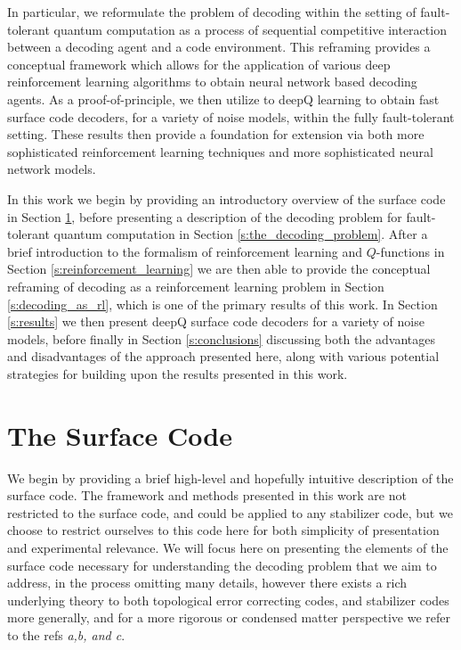 \documentclass[onecolumn,preprintnumbers,amsmath,amssymb,notitlepage,nofootinbib,longbibliography,superscriptaddress,aps,pra,10pt]{revtex4-1}
\begin{document}
	In particular, we reformulate the problem of decoding within the setting of fault-tolerant quantum computation as a process of sequential competitive interaction between a decoding agent and a code environment.
	This reframing provides a conceptual framework which allows for the application of various deep reinforcement learning algorithms to obtain neural network based decoding agents.
	As a proof-of-principle, we then utilize to deepQ learning to obtain fast surface code decoders, for a variety of noise models, within the fully fault-tolerant setting.
	These results then provide a foundation for extension via both more sophisticated reinforcement learning techniques and more sophisticated neural network models.

	In this work we begin by providing an introductory overview of the surface code in Section \ref{s:the_surface_code}, before presenting a description of the decoding problem for fault-tolerant quantum computation in Section \ref{s:the_decoding_problem}.
	After a brief introduction to the formalism of reinforcement learning and $Q$-functions in Section \ref{s:reinforcement_learning} we are then able to provide the conceptual reframing of decoding as a reinforcement learning problem in Section \ref{s:decoding_as_rl}, which is one of the primary results of this work.
	In Section \ref{s:results} we then present deepQ surface code decoders for a variety of noise models, before finally in Section \ref{s:conclusions} discussing both the advantages and disadvantages of the approach presented here, along with various potential strategies for building upon the results presented in this work.

\section{The Surface Code}\label{s:the_surface_code}


    We begin by providing a brief high-level and hopefully intuitive description of the surface code. The framework and methods presented in this work are not restricted to the surface code, and could be applied to any stabilizer code, but we choose to restrict ourselves to this code here for both simplicity of presentation and experimental relevance. We will focus here on presenting the elements of the surface code necessary for understanding the decoding problem that we aim to address, in the process omitting many details, however there exists a rich underlying theory to both topological error correcting codes, and stabilizer codes more generally, and for a more rigorous or condensed matter perspective we refer to the refs \textit{a,b, and c}.
\end{document}
